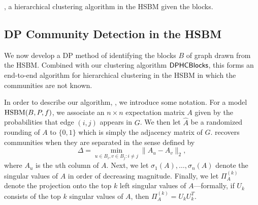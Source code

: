 \begin{algorithm}
\caption{\dphcblocks{}, a hierarchical clustering algorithm in the HSBM given the blocks.}\label{alg:priv-hc-hsbm}
\begin{algorithmic}
\ENDFOR
{}
\ENDFOR
\ENDWHILE
{}
\end{algorithmic}
\end{algorithm}


\subsection{DP Community Detection in the HSBM}\label{sec:dp-comm-detection}

We now develop a DP method of identifying the blocks $B$ of graph drawn from the HSBM. Combined with our clustering algorithm $\textsf{DPHCBlocks}{}$, this forms an end-to-end algorithm for hierarchical clustering in the HSBM in which the communities are not known. 

In order to describe our algorithm, \dpcom{}, we introduce some notation. For a model $\textnormal{HSBM}{}(B,P,f)$, we associate an $n \times n$ expectation matrix $A$ given by the probabilities that edge $(i,j)$ appears in $G$. We then let $\hat{A}$ be a randomized rounding of $A$ to $\{0,1\}$ which is simply the adjacency matrix of $G$. \dpcom{} recovers communities when they are separated in the sense defined by 
\[
    \Delta = \min_{u \in B_i, v \in B_j : i \neq j} \|A_u - A_v\|_2,
\]
where $A_u$ is the $u$th column of $A$. Next, we let $\sigma_1(A), \ldots, \sigma_n(A)$ denote the singular values of $A$ in order of decreasing magnitude. Finally, we let $\Pi_A^{(k)}$ denote the projection onto the top $k$ left singular values of $A$---formally, if $U_k$ consists of the top $k$ singular values of $A$, then $\Pi_A^{(k)} = U_kU_k^T$.

